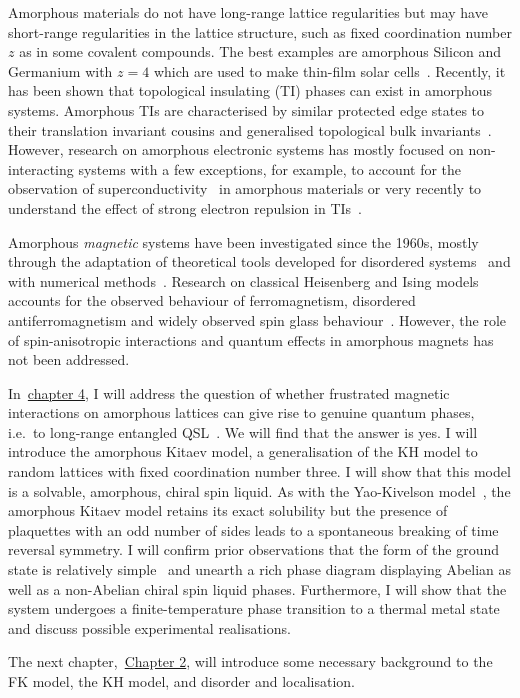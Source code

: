 Amorphous materials do not have long-range lattice regularities but may have short-range regularities in the lattice structure, such as fixed coordination number \(z\) as in some covalent compounds. The best examples are amorphous Silicon and Germanium with \(z=4\) which are used to make thin-film solar cells~\autocite{Weaire1971,betteridge1973possible}. Recently, it has been shown that topological insulating (TI) phases can exist in amorphous systems. Amorphous TIs are characterised by similar protected edge states to their translation invariant cousins and generalised topological bulk invariants~\autocite{mitchellAmorphousTopologicalInsulators2018,agarwala2019topological,marsalTopologicalWeaireThorpeModels2020,costa2019toward,agarwala2020higher,spring2021amorphous,corbae2019evidence}. However, research on amorphous electronic systems has mostly focused on non-interacting systems with a few exceptions, for example, to account for the observation of superconductivity~\autocite{buckel1954einfluss,mcmillan1981electron,meisel1981eliashberg,bergmann1976amorphous,mannaNoncrystallineTopologicalSuperconductors2022} in amorphous materials or very recently to understand the effect of strong electron repulsion in TIs~\autocite{kim2022fractionalization}.

Amorphous \emph{magnetic} systems have been investigated since the 1960s, mostly through the adaptation of theoretical tools developed for disordered systems~\autocite{aharony1975critical,Petrakovski1981,kaneyoshi1992introduction,Kaneyoshi2018} and with numerical methods~\autocite{fahnle1984monte,plascak2000ising}. Research on classical Heisenberg and Ising models accounts for the observed behaviour of ferromagnetism, disordered antiferromagnetism and widely observed spin glass behaviour~\autocite{coey1978amorphous}. However, the role of spin-anisotropic interactions and quantum effects in amorphous magnets has not been addressed.

In~\protect\hyperlink{chap:4-the-amorphous-kitaev-model}{chapter 4}, I will address the question of whether frustrated magnetic interactions on amorphous lattices can give rise to genuine quantum phases, i.e.~to long-range entangled QSL~\autocite{Anderson1973,Knolle2019,Savary2016,Lacroix2011}. We will find that the answer is yes. I will introduce the amorphous Kitaev model, a generalisation of the KH model to random lattices with fixed coordination number three. I will show that this model is a solvable, amorphous, chiral spin liquid. As with the Yao-Kivelson model~\autocite{yaoExactChiralSpin2007}, the amorphous Kitaev model retains its exact solubility but the presence of plaquettes with an odd number of sides leads to a spontaneous breaking of time reversal symmetry. I will confirm prior observations that the form of the ground state is relatively simple~\autocite{OBrienPRB2016,eschmannThermodynamicClassificationThreedimensional2020} and unearth a rich phase diagram displaying Abelian as well as a non-Abelian chiral spin liquid phases. Furthermore, I will show that the system undergoes a finite-temperature phase transition to a thermal metal state and discuss possible experimental realisations.

The next chapter,~\protect\hyperlink{chap:2-background}{Chapter 2}, will introduce some necessary background to the FK model, the KH model, and disorder and localisation.
